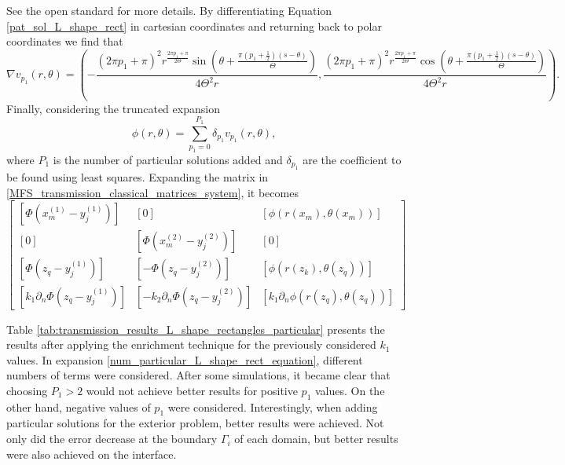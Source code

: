 See the open standard \cite{jones2010wg14} for more details.
By differentiating Equation \eqref{pat_sol_L_shape_rect} in cartesian coordinates and returning back to polar coordinates we find that
\begin{equation*}
    \nabla v_{p_1}(r, \theta) = \left(-\frac{(2 \pi  {p_1}+\pi )^2 r^{\frac{2 \pi  {p_1}+\pi }{2 \Theta }} \sin \left(\theta +\frac{\pi  \left(p_1+\frac{1}{2}\right) (s-\theta )}{\Theta }\right)}{4 \Theta ^2 r},\frac{(2 \pi  p_1+\pi )^2 r^{\frac{2 \pi  p_1+\pi }{2 \Theta }} \cos \left(\theta +\frac{\pi  \left(p_1+\frac{1}{2}\right) (s-\theta )}{\Theta }\right)}{4 \Theta ^2 r}\right).
\end{equation*}
Finally, considering the truncated expansion
\begin{equation}\label{num_particular_L_shape_rect_equation}
    \phi(r,\theta)=\sum_{p_1=0}^{P_1} \delta_{p_1} v_{p_1}(r, \theta),
\end{equation}
where \(P_1\) is the number of particular solutions added and \(\delta_{p_1}\) are the coefficient to be found using least squares. Expanding the matrix in \eqref{MFS_transmission_classical_matrices_system}, it becomes
\begin{equation*}
    \renewcommand{\arraystretch}{1.75} %
    \begin{bmatrix}
        \left[\Phi\left(x^{(1)}_{m}-y_j^{(1)}\right)\right] & [0] & \left[\phi(r\left(x_m\right),\theta\left(x_m\right))\right]\\
        [0] & \left[\Phi\left(x^{(2)}_{m}-y_j^{(2)}\right)\right] & \left[0\right]\\
        \left[\Phi\left(z_q-y_j^{(1)}\right)\right] & \left[-\Phi\left(z_q-y_j^{(2)}\right)\right] & \left[\phi(r\left(z_k\right),\theta\left(z_q\right))\right]\\
        \left[k_1\partial_n \Phi\left(z_q-y_j^{(1)}\right)\right] & \left[-k_2 \partial_n \Phi\left(z_q-y_j^{(2)}\right)\right] & \left[k_1 \partial_n\phi(r\left(z_q\right),\theta\left(z_q\right))\right]
    \end{bmatrix}
\end{equation*}

Table \ref{tab:transmission_results_L_shape_rectangles_particular} presents the results after applying the enrichment technique for the previously considered \(k_1\) values. In expansion \eqref{num_particular_L_shape_rect_equation}, different numbers of terms were considered. After some simulations, it became clear that choosing \(P_1 > 2\) would not achieve better results for positive \(p_1\) values. On the other hand, negative values of \(p_1\) were considered. Interestingly, when adding particular solutions for the exterior problem, better results were achieved. Not only did the error decrease at the boundary \(\Gamma_i\) of each domain, but better results were also achieved on the interface.

